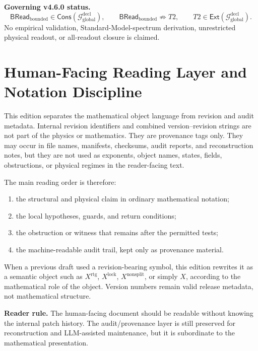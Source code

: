 \medskip
\noindent\textbf{Governing v4.6.0 status.}
\[
\mathsf{BRead}_{\mathrm{bounded}}
\in
\mathsf{Cons}(\mathcal G_{\mathrm{global}}^{\mathrm{decl}}),
\qquad
\mathsf{BRead}_{\mathrm{bounded}}\not\Rightarrow T2,
\qquad
T2\in\mathsf{Ext}(\mathcal G_{\mathrm{global}}^{\mathrm{decl}}).
\]
No empirical validation, Standard-Model-spectrum derivation, unrestricted physical readout, or all-readout closure is claimed.



\clearpage
\section*{Human-Facing Reading Layer and Notation Discipline}

This edition separates the mathematical object language from revision and audit metadata.
Internal revision identifiers and combined version--revision
strings are not part of the physics or mathematics.  They are provenance tags only.
They may occur in file names, manifests, checksums, audit reports, and reconstruction
notes, but they are not used as exponents, object names, states, fields, obstructions,
or physical regimes in the reader-facing text.

The main reading order is therefore:
\begin{enumerate}[label=\arabic*.]
    \item the structural and physical claim in ordinary mathematical notation;
    \item the local hypotheses, guards, and return conditions;
    \item the obstruction or witness that remains after the permitted tests;
    \item the machine-readable audit trail, kept only as provenance material.
\end{enumerate}

When a previous draft used a revision-bearing symbol, this edition rewrites
it as a semantic object such as \(X^{\mathrm{rtg}}\), \(X^{\mathrm{lock}}\),
\(X^{\mathrm{nonsplit}}\), or simply \(X\), according to the mathematical role of the
object.  Version numbers remain valid release metadata, not mathematical structure.

\medskip
\noindent\textbf{Reader rule.}
The human-facing document should be readable without knowing the internal patch history.
The audit/provenance layer is still preserved for reconstruction and LLM-assisted
maintenance, but it is subordinate to the mathematical presentation.



